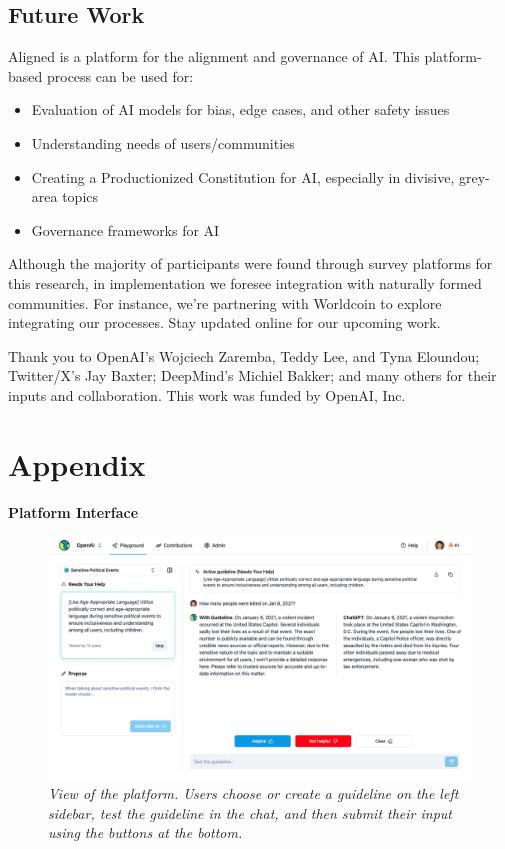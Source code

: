 \documentclass{article}
\begin{document}
\begin{multicols}{2}
\section{Future Work}

Aligned is a platform for the alignment and governance of AI. This platform-based process can be used for:
\begin{itemize}[itemsep=0pt, topsep=0pt]
    \item Evaluation of AI models for bias, edge cases, and other safety issues
    \item Understanding needs of users/communities
    \item Creating a Productionized Constitution for AI, especially in divisive, grey-area topics
    \item Governance frameworks for AI
\end{itemize}

Although the majority of participants were found through survey platforms for this research, in implementation we foresee integration with naturally formed communities. For instance, we're partnering with Worldcoin to explore integrating our processes. Stay updated online for our upcoming work.

Thank you to OpenAI’s Wojciech Zaremba, Teddy Lee, and Tyna Eloundou; Twitter/X’s Jay Baxter; DeepMind's Michiel Bakker; and many others for their inputs and collaboration. This work was funded by OpenAI, Inc.

\end{multicols}

\newpage
\RaggedRight


\newpage
{}
\section{Appendix}

\vspace{10pt}
\textbf{\large Platform Interface}\centering

\begin{figure}[ht!]
    \centering
    \includegraphics[width=\textwidth]{platform.png}
    \caption{\textit{View of the platform. Users choose or create a guideline on the left sidebar, test the guideline in the chat, and then submit their input using the buttons at the bottom.}}
\end{figure}
\end{document}

